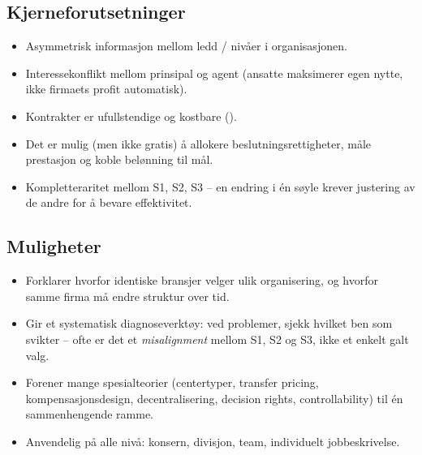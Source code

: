 \subsection*{Kjerneforutsetninger}
\begin{itemize}
\item Asymmetrisk informasjon mellom ledd / nivåer i organisasjonen.
\item Interessekonflikt mellom prinsipal og agent (ansatte maksimerer egen nytte, ikke firmaets profit automatisk).
\item Kontrakter er ufullstendige og kostbare ().
\item Det er mulig (men ikke gratis) å allokere beslutningsrettigheter, måle prestasjon og koble belønning til mål.
\item Kompletter\-aritet mellom S1, S2, S3 -- en endring i én søyle krever justering av de andre for å bevare effektivitet.
\end{itemize}

\subsection*{Muligheter}
\begin{itemize}
\item Forklarer hvorfor identiske bransjer velger ulik organisering, og hvorfor samme firma må endre struktur over tid.
\item Gir et systematisk diagnoseverktøy: ved problemer, sjekk hvilket ben som svikter -- ofte er det et \emph{misalignment} mellom S1, S2 og S3, ikke et enkelt galt valg.
\item Forener mange spesialteorier (centertyper, transfer pricing, kompensasjonsdesign, decentralisering, decision rights, controllability) til én sammenhengende ramme.
\item Anvendelig på alle nivå: konsern, divisjon, team, individuelt jobbeskrivelse.
\end{itemize}

